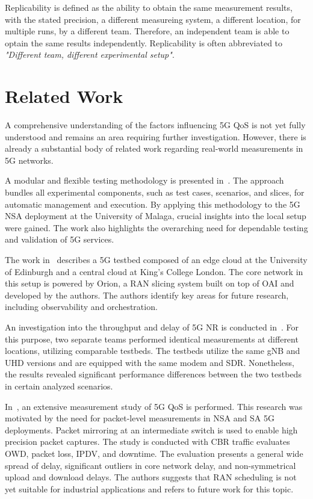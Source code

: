 Replicability is defined as the ability to obtain the same measurement results, with the stated precision, a different
measureing system, a different location, for multiple runs, by a different team.
Therefore, an independent team is able to optain the same results independently.
Replicability is often abbreviated to \emph{"Different team, different experimental setup"}.



\chapter{Related Work}\label{chap:relatedwork}

A comprehensive understanding of the factors influencing 5G \gls{QoS} is not yet fully understood and remains an area requiring further investigation.
However, there is already a substantial body of related work regarding real-world measurements in 5G networks.

A modular and flexible testing methodology is presented in~\cite{diaz2020modular}.
The approach bundles all experimental components, such as test cases, scenarios, and slices, for automatic management and execution.
By applying this methodology to the 5G \gls{NSA} deployment at the University of Malaga,
crucial insights into the local setup were gained.
The work also highlights the overarching need for dependable testing and validation of 5G services.

The work in~\cite{foukas2018experience} describes a 5G testbed composed of an edge
cloud at the University of Edinburgh and a central cloud at King's College London.
The core network in this setup is powered by Orion,
a RAN slicing system built on top of OAI and developed by the authors.
The authors identify key areas for future research,
including observability and orchestration.

An investigation into the throughput and delay of 5G NR is conducted in~\cite{raffeck2024parameterizing}.
For this purpose, two separate teams performed identical measurements at different locations,
utilizing comparable testbeds.
The testbeds utilize the same \gls{gNB} and \gls{UHD} versions and are equipped with the same modem and SDR.
Nonetheless, the results revealed significant performance differences between the two testbeds in certain analyzed scenarios.

In~\cite{Rischke20215GCN}, an extensive measurement study of 5G \gls{QoS} is performed.
This research was motivated by the need for packet-level measurements in \gls{NSA} and \gls{SA} 5G deployments.
Packet mirroring at an intermediate switch is used to enable high precision packet captures.
The study is conducted with \gls{CBR} traffic evaluates \gls{OWD}, packet loss, \gls{IPDV}, and downtime.
The evaluation presents a general wide spread of delay, significant outliers in core network delay, and non-symmetrical upload and download delays.
The authors suggests that \gls{RAN} scheduling is not yet suitable for industrial applications and refers to future work for this topic.

